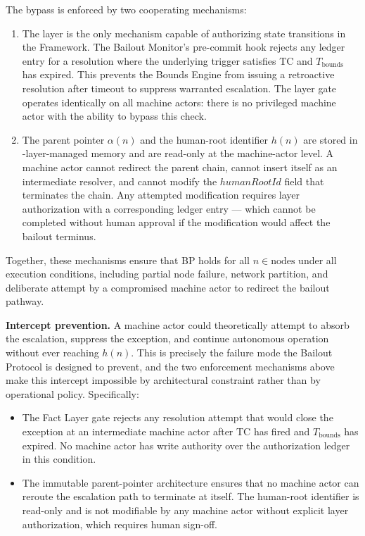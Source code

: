 The bypass is enforced by two cooperating mechanisms:

\begin{enumerate}
    \item[\textbf{Fact Layer gate.}] The \fact{} layer is the only mechanism capable of authorizing state transitions in the \bxthree{} Framework. The Bailout Monitor's pre-commit hook rejects any ledger entry for a resolution where the underlying trigger satisfies TC and $T_{\text{bounds}}$ has expired. This prevents the Bounds Engine from issuing a retroactive resolution after timeout to suppress warranted escalation. The \fact{} layer gate operates identically on all machine actors: there is no privileged machine actor with the ability to bypass this check.

    \item[\textbf{Immutable parent-pointer and human-root architecture.}] The parent pointer $\alpha(n)$ and the human-root identifier $h(n)$ are stored in \fact-layer-managed memory and are read-only at the machine-actor level. A machine actor cannot redirect the parent chain, cannot insert itself as an intermediate resolver, and cannot modify the $humanRootId$ field that terminates the chain. Any attempted modification requires \purpose{} layer authorization with a corresponding ledger entry — which cannot be completed without human approval if the modification would affect the bailout terminus.
\end{enumerate}

Together, these mechanisms ensure that BP holds for all $n \in \text{nodes}$ under all execution conditions, including partial node failure, network partition, and deliberate attempt by a compromised machine actor to redirect the bailout pathway.

\bigskip
\noindent\textbf{Intercept prevention.} A machine actor could theoretically attempt to absorb the escalation, suppress the exception, and continue autonomous operation without ever reaching $h(n)$. This is precisely the failure mode the Bailout Protocol is designed to prevent, and the two enforcement mechanisms above make this intercept impossible by architectural constraint rather than by operational policy. Specifically:

\begin{itemize}\itemsep=0pt
    \item The Fact Layer gate rejects any resolution attempt that would close the exception at an intermediate machine actor after TC has fired and $T_{\text{bounds}}$ has expired. No machine actor has write authority over the authorization ledger in this condition.
    \item The immutable parent-pointer architecture ensures that no machine actor can reroute the escalation path to terminate at itself. The human-root identifier is read-only and is not modifiable by any machine actor without explicit \purpose{} layer authorization, which requires human sign-off.
\end{itemize}

